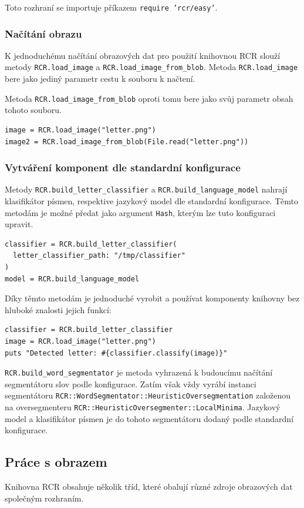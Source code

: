 \documentclass[a4paper]{article}
\begin{document}
Toto rozhraní se importuje příkazem \texttt{require 'rcr/easy'}.

\subsubsection{Načítání obrazu}
K jednoduchému načítání obrazových dat pro použití knihovnou RCR slouží metody
\texttt{RCR.load\_image} a \texttt{RCR.load\_image\_from\_blob}. Metoda
\texttt{RCR.load\_image} bere jako jediný parametr cestu k souboru k načtení.

Metoda \texttt{RCR.load\_image\_from\_blob} oproti tomu bere jako svůj parametr
obsah tohoto souboru.
\begin{lstlisting}
image = RCR.load_image("letter.png")
image2 = RCR.load_image_from_blob(File.read("letter.png"))
\end{lstlisting}

\subsubsection{Vytváření komponent dle standardní konfigurace}
Metody \texttt{RCR.build\_letter\_classifier} a
\texttt{RCR.build\_language\_model} nahrají klasifikátor písmen, respektive jazykový model
dle standardní konfigurace. Těmto metodám je možné předat jako argument
\texttt{Hash}, kterým lze tuto konfiguraci upravit.
\begin{lstlisting}
classifier = RCR.build_letter_classifier(
  letter_classifier_path: "/tmp/classifier"
)
model = RCR.build_language_model
\end{lstlisting}

Díky těmto metodám je jednoduché vyrobit a používat komponenty knihovny
bez hluboké znalosti jejich funkcí:
\begin{lstlisting}
classifier = RCR.build_letter_classifier
image = RCR.load_image("letter.png")
puts "Detected letter: #{classifier.classify(image)}"
\end{lstlisting}

\texttt{RCR.build\_word\_segmentator} je metoda vyhrazená k budoucímu načítání
segmentátoru slov podle konfigurace. Zatím však vždy vyrábí instanci
segmentátoru
\texttt{RCR::WordSegmentator::HeuristicOversegmentation} založenou na
oversegmenteru \texttt{RCR::HeuristicOversegmenter::LocalMinima}. Jazykový model
a klasifikátor písmen je do tohoto segmentátoru dodaný podle standardní
konfigurace.

\subsection{Práce s obrazem}
Knihovna RCR obsahuje několik tříd, které obalují různé zdroje obrazových dat
společným rozhraním.
\end{document}
